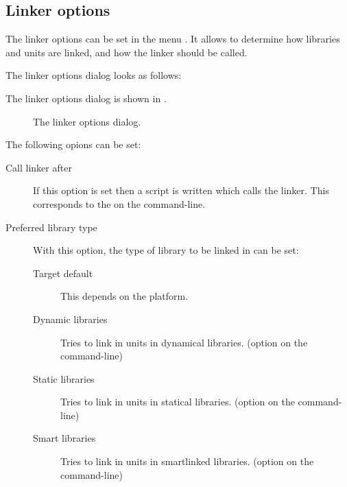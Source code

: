 \subsection{Linker options}
The linker options can be set in the menu . It allows
to determine how libraries and units are linked, and how the linker should
be called. 
\begin{htmlonly}
The linker options dialog looks as follows:
\end{htmlonly}
\begin{latexonly}
The linker options dialog is shown in
.
\begin{figure}[ht]
\begin{center}
\caption{The linker options dialog.}\label{fig:olinker}
\ifpdf
{}
\else
{}
\fi
\end{center}
\end{figure}
\end{latexonly}
The following opions can be set:
\begin{description}
\item[Call linker after] If this option is set then a script is written
which calls the linker. This corresponds to the  on the
command-line.
\item[Preferred library type] With this option, the type of library to be
linked in can be set:
\begin{description}
\item[Target default] This depends on the platform.
\item[Dynamic libraries] Tries to link in units in dynamical libraries. 
(option  on the command-line)
\item[Static libraries] Tries to link in units in statical libraries.
(option  on the command-line)
\item[Smart libraries] Tries to link in units in smartlinked libraries.
(option  on the command-line)
\end{description}
\end{description}
%
%
